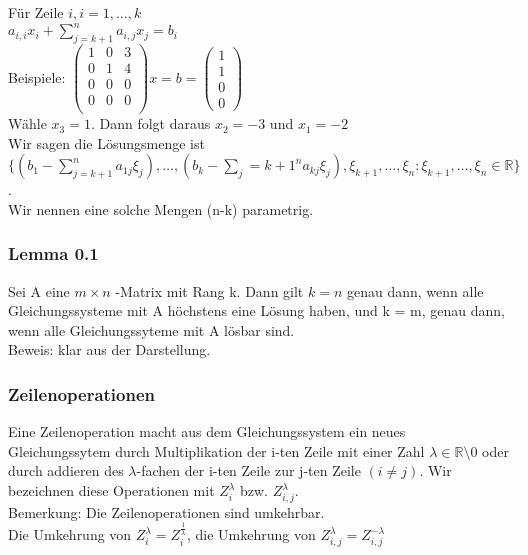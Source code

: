 \documentclass{article}
\newcommand{\lb}{\lambda}
\newcommand{\mlb}{$\lb$}
\newcommand{\R}{\mathbb{R}}
\begin{document}
Für Zeile $i, i =1, \dots, k$ \\
$a_{i, i} x_i + \sum_{j=k+1}^n a_{i,j} x_j = b_i$\\
Beispiele:
$
\begin{pmatrix}
1 & 0 & 3\\
0 & 1 & 4\\
0 & 0 & 0\\
0 & 0 & 0\\
\end{pmatrix} x = b =
\begin{pmatrix}
1\\1\\0\\0
\end{pmatrix}
$\\
Wähle $x_3 = 1$. Dann folgt daraus $x_2 = -3$ und $x_1 = -2$\\
Wir sagen die Lösungsmenge ist \\
$\{(b_1 - \sum_{j=k+1}^na_{1j}\xi_j), \dots,  (b_k - \sum_j={k+1}^na_{kj}\xi_j), \xi_{k+1}, \dots, \xi_n : \xi_{k+1}, \dots, \xi_n \in \R\}$.\\
Wir nennen eine solche Mengen (n-k) parametrig.

\subsubsection{Lemma 0.1}
Sei A eine $m\times n$ -Matrix mit Rang k. Dann gilt $k=n$  genau dann, wenn alle Gleichungssysteme mit A höchstens eine Lösung haben, und k = m, genau dann, wenn alle Gleichungssyteme mit A lösbar sind.\\
Beweis: klar aus der Darstellung.\\

\subsubsection{Zeilenoperationen}
Eine Zeilenoperation macht aus dem Gleichungssystem ein neues Gleichungssytem durch Multiplikation  der i-ten Zeile mit einer Zahl $\lb \in \R \setminus 0$ oder durch addieren des \mlb -fachen der i-ten Zeile zur j-ten Zeile $(i \neq j)$. Wir bezeichnen diese Operationen mit $Z_i^\lb$ bzw. $Z_{i,j}^\lb$.\\
Bemerkung: Die Zeilenoperationen sind umkehrbar. \\
Die Umkehrung von $Z_i^\lb = Z_i^{\frac{1}{\lb}}$, die Umkehrung von $Z_{i,j}^\lb = Z_{i,j}^{-\lb}$
\end{document}
